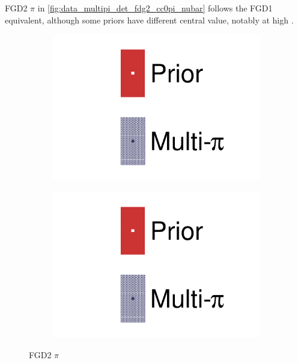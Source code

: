 FGD2 $\pi$ in \autoref{fig:data_multipi_det_fdg2_cc0pi_nubar} follows the FGD1 equivalent, although some priors have different central value, notably at high \pmu.
\begin{figure}[h]
	\centering
	\begin{subfigure}[t]{0.32\textwidth}
		\includegraphics[width=\textwidth,page=48, trim={0mm 0mm 0mm 0mm}, clip]{figures/mach3/2018/data/2018a_FixedCov_RedCov_Mpi_Data_merge_drawPar_withDet}
	\end{subfigure}
	\begin{subfigure}[t]{0.32\textwidth}
		\includegraphics[width=\textwidth,page=49, trim={0mm 0mm 0mm 0mm}, clip]{figures/mach3/2018/data/2018a_FixedCov_RedCov_Mpi_Data_merge_drawPar_withDet}
	\end{subfigure}
	\caption{FGD2 $\pi$}
	\label{fig:data_multipi_det_fdg2_cc0pi_nubar}
\end{figure}

